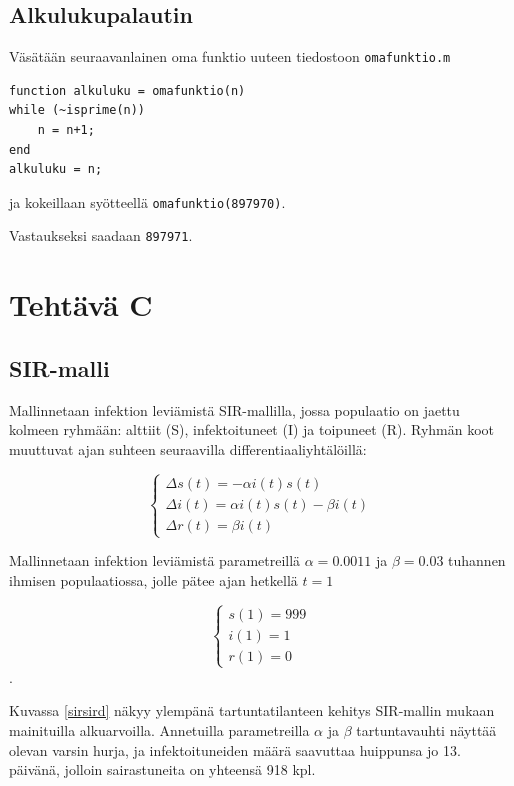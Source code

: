 \documentclass[a4paper,11pt]{article}
\begin{document}
{\subsection{Alkulukupalautin}

Väsätään seuraavanlainen oma funktio uuteen tiedostoon \texttt{omafunktio.m}

\begin{lstlisting}
function alkuluku = omafunktio(n)
while (~isprime(n))
    n = n+1;
end
alkuluku = n;
\end{lstlisting}

ja kokeillaan syötteellä \texttt{omafunktio(897970)}.

Vastaukseksi saadaan \texttt{897971}.

\clearpage

\section{Tehtävä C}

\subsection{SIR-malli}

Mallinnetaan infektion leviämistä SIR-mallilla, jossa populaatio on jaettu kolmeen ryhmään: alttiit (S), infektoituneet (I) ja toipuneet (R). Ryhmän koot muuttuvat ajan suhteen seuraavilla differentiaaliyhtälöillä:

\begin{equation}
\begin{cases}
\Delta s(t) = -\alpha i(t) s(t) \\
\Delta i(t) = \alpha i(t) s(t) - \beta i(t) \\
\Delta r(t) = \beta i(t)
\end{cases}
\end{equation}

Mallinnetaan infektion leviämistä parametreillä $\alpha = 0.0011$ ja $\beta = 0.03$ tuhannen ihmisen populaatiossa, jolle pätee ajan hetkellä $t=1$

\begin{equation}
\begin{cases}
s(1) = 999 \\
i(1) = 1 \\
r(1) = 0
\end{cases}
\end{equation}.

Kuvassa \ref{sirsird} näkyy ylempänä tartuntatilanteen kehitys SIR-mallin mukaan mainituilla alkuarvoilla. Annetuilla parametreilla $\alpha$ ja $\beta$ tartuntavauhti näyttää olevan varsin hurja, ja infektoituneiden määrä saavuttaa huippunsa jo 13. päivänä, jolloin sairastuneita on yhteensä 918 kpl.

}
\end{document}
